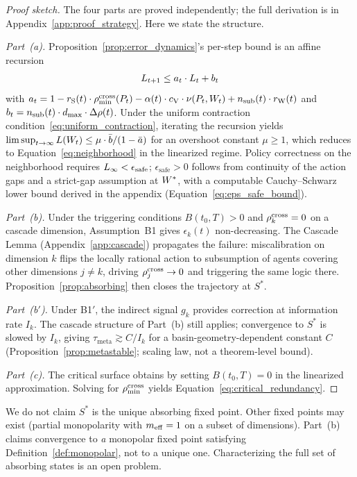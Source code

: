\begin{proof}[Proof sketch]
The four parts are proved independently; the full derivation is in
Appendix~\ref{app:proof_strategy}.  Here we state the structure.

\emph{Part~(a).}
Proposition~\ref{prop:error_dynamics}'s per-step bound is an affine
recursion
\begin{equation}
\label{eq:affine_recursion}
L_{t+1} \leq a_t \cdot L_t + b_t
\end{equation}
with
$a_t = 1 - r_{\mathrm{S}}(t) \cdot \rho_{\min}^{\mathrm{cross}}(P_t)
  - \alpha(t) \cdot c_{\mathrm{V}} \cdot \nu(P_t, W_t)
  + n_{\mathrm{sub}}(t) \cdot r_{\mathrm{W}}(t)$
and $b_t = n_{\mathrm{sub}}(t) \cdot d_{\mathrm{max}} \cdot \Delta\rho(t)$.  Under the
uniform contraction condition~\eqref{eq:uniform_contraction},
iterating the recursion yields
$\limsup_{t \to \infty} L(W_t) \leq \mu \cdot \bar{b}/(1 -
\bar{a})$ for an overshoot constant $\mu \geq 1$, which reduces to
Equation~\ref{eq:neighborhood} in the linearized regime.
Policy correctness on the neighborhood requires $L_\infty <
\epsilon_{\mathrm{safe}}$; $\epsilon_{\mathrm{safe}} > 0$ follows
from continuity of the action gaps and a strict-gap assumption at
$W^*$, with a computable Cauchy--Schwarz lower bound derived in
the appendix (Equation~\ref{eq:eps_safe_bound}).

\emph{Part~(b).}
Under the triggering conditions $B(t_0,T) > 0$ and $\rho^{\mathrm{cross}}_k = 0$
on a cascade dimension, Assumption~B1 gives $\epsilon_k(t)$
non-decreasing.  The Cascade Lemma (Appendix~\ref{app:cascade})
propagates the failure: miscalibration on dimension $k$ flips the
locally rational action to subsumption of agents covering other
dimensions $j \neq k$, driving $\rho^{\mathrm{cross}}_j \to 0$ and triggering the
same logic there.  Proposition~\ref{prop:absorbing} then closes the
trajectory at $S^*$.

\emph{Part~(b$'$).}
Under B1$'$, the indirect signal $g_k$ provides correction at
information rate $I_k$.  The cascade structure of Part~(b) still
applies; convergence to $S^*$ is slowed by $I_k$, giving
$\tau_{\mathrm{meta}} \gtrsim C / I_k$ for a basin-geometry-dependent
constant $C$ (Proposition~\ref{prop:metastable}; scaling law, not a
theorem-level bound).

\emph{Part~(c).}
The critical surface obtains by setting $B(t_0,T) = 0$ in the
linearized approximation.  Solving for $\rho_{\min}^{\mathrm{cross}}$ yields
Equation~\ref{eq:critical_redundancy}.
\end{proof}

\begin{remark}[Uniqueness]
We do not claim $S^*$ is the unique absorbing fixed point.  Other
fixed points may exist (partial monopolarity with $m_{\mathrm{eff}} = 1$ on a
subset of dimensions).  Part~(b) claims convergence to \emph{a}
monopolar fixed point satisfying Definition~\ref{def:monopolar}, not
to a unique one.  Characterizing the full set of absorbing states is
an open problem.
\end{remark}

